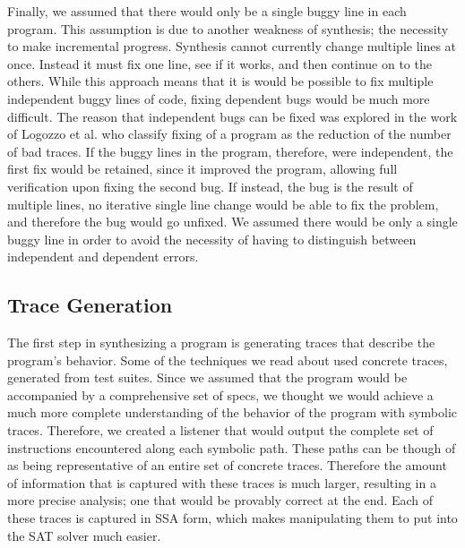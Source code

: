 \documentclass[]{article}
\begin{document}
Finally, we assumed that there would only be a single buggy line in each
program.  This assumption is due to another weakness of synthesis; the
necessity to make incremental progress.  Synthesis cannot currently change
multiple lines at once.  Instead it must fix one line, see if it works, and
then continue on to the others.  While this approach means that it is would
be possible to fix multiple independent buggy lines of code, fixing
dependent bugs would be much more difficult.  The reason that independent
bugs can be fixed was explored in the work of Logozzo et al. who classify
fixing of a program as the reduction of the number of bad traces.  If the
buggy lines in the program, therefore, were independent, the first fix would
be retained, since it improved the program, allowing full verification upon
fixing the second bug.  If instead, the bug is the result of multiple lines,
no iterative single line change would be able to fix the problem, and
therefore the bug would go unfixed.  We assumed there would be only a single
buggy line in order to avoid the necessity of having to distinguish between
independent and dependent errors.

\subsection{Trace Generation}
The first step in synthesizing a program is generating traces that describe
the program's behavior.  Some of the techniques we read about used concrete
traces, generated from test suites.  Since we assumed that the program would
be accompanied by a comprehensive set of specs, we thought we would achieve
a much more complete understanding of the behavior of the program with
symbolic traces.  Therefore, we created a listener that would output the
complete set of instructions encountered along each symbolic path.  These
paths can be though of as being representative of an entire set of concrete
traces.  Therefore the amount of information that is captured with these
traces is much larger, resulting in a more precise analysis; one that would
be provably correct at the end.  Each of these traces is captured in SSA
form, which makes manipulating them to put into the SAT solver much easier.
\end{document}
